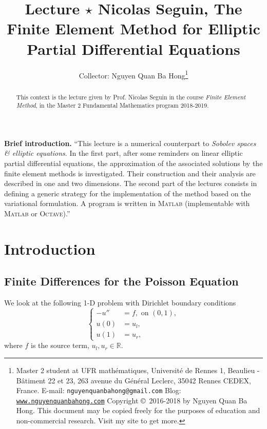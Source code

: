\documentclass[11pt,a4paper,center,notitlepage]{article}
\title{Lecture $\star$ Nicolas Seguin, The Finite Element Method for Elliptic Partial Differential Equations}
\author{Collector: Nguyen Quan Ba Hong\footnote{Master 2 student at UFR math\'ematiques, Universit\'e de Rennes 1, Beaulieu - B\^atiment 22 et 23, 263 avenue du G\'en\'eral Leclerc, 35042 Rennes CEDEX, France.\newline
E-mail: \texttt{nguyenquanbahong@gmail.com} \newline
Blog: \texttt{\url{www.nguyenquanbahong.com}} \newline 
Copyright \copyright\ 2016-2018 by Nguyen Quan Ba Hong. This document may be copied freely for the purposes of education and non-commercial research. Visit my site to get more.}}
\numberwithin{equation}{section}
\begin{document}
\maketitle
\begin{abstract}
This context is the lecture given by Prof. Nicolas Seguin in the course \textit{Finite Element Method}, in the Master 2 Fundamental Mathematics program 2018-2019. 
\end{abstract}
\textbf{Brief introduction.} ``This lecture is a numerical counterpart to \textit{Sobolev spaces \& elliptic equations}. In the first part, after some reminders on linear elliptic partial differential equations, the approximation of the associated solutions by the finite element methods is investigated. Their construction and their analysis are described in one and two dimensions. The second part of the lectures consists in defining a generic strategy for the implementation of the method based on the variational formulation. A program is written in \textsc{Matlab} (implementable with \textsc{Matlab} or \textsc{Octave}).''
%
\maketitle
\newpage
\tableofcontents
\newpage
\section{Introduction}
\subsection{Finite Differences for the Poisson Equation}
We look at the following 1-D problem with Dirichlet boundary conditions
\begin{equation}
\label{1.1}
\left\{ \begin{split}
 - u'' &= f, \mbox{ on } \left( {0,1} \right),\\
u\left( 0 \right) &= {u_l},\\
u\left( 1 \right) &= {u_r},
\end{split} \right.
\end{equation}
where $f$ is the source term, $u_l, u_r \in \mathbb{R}$. 
\end{document}
